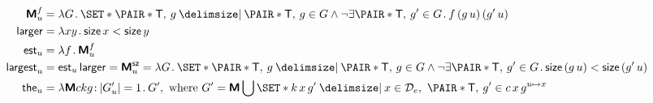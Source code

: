 \documentclass[12pt,fleqn]{article}
\newcommand{\M}{\text{\sffamily\bfseries M}}
\begin{document}
\begin{align*}
  \M_u^f &=
  \lambda G \dt
    \set{%
      \pair{\cn{T}}{g}
    \giv
      \pair{\cn{T}}{g} \in G
      \land
      \neg\exists\pair{\cn{T}}{g'} \in G \dt f\,(g\,u)\,(g'\,u)
    } \\
  \cn{larger} &=
  \lambda xy \dt \cn{size}\,x < \cn{size}\,y \\
  \cn{est}_u &=
  \lambda f \dt \M_u^f\\
  \cn{largest}_u &=
  \cn{est}_u\,\cn{larger} =
  \M_u^\cn{sz} =
  \lambda G \dt
    \set{%
      \pair{\cn{T}}{g}
    \giv
      \pair{\cn{T}}{g} \in G
      \land
      \neg\exists\pair{\cn{T}}{g'} \in G \dt
        \cn{size}\,(g\,u) < \cn{size}\,(g'\,u)
    } \\
  \cn{the}_u &=
  \lambda \M ckg \col |G'_u| = 1 \dt G',
  \textrm{ where }
  G' = \M \bigcup \set{%
    k\,x\,g'
  \giv
    x\in \mathcal{D}_e,\ \pair{\cn{T}}{g'} \in c\,x\,g^{u\mapsto x}
  } \\
\end{align*}
\end{document}
